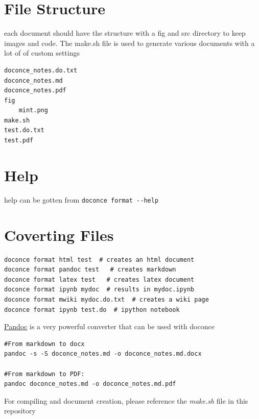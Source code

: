 \documentclass[%
twocolumn,
twoside,                 %
final,                   %
10pt]{article}
\begin{document}
\section{File Structure}
\label{sec:fil}

each document should have the structure with a fig and src directory to keep images and code. The make.sh file is used to generate various documents with a lot of of custom settings

\begin{verbatim}
doconce_notes.do.txt
doconce_notes.md
doconce_notes.pdf
fig
	mint.png
make.sh
test.do.txt
test.pdf
\end{verbatim}


\section{Help}

help can be gotten from \Verb!doconce format --help!

\section{Coverting Files}

\begin{verbatim}
doconce format html test  # creates an html document
doconce format pandoc test   # creates markdown
doconce format latex test   # creates latex document
doconce format ipynb mydoc  # results in mydoc.ipynb
doconce format mwiki mydoc.do.txt  # creates a wiki page
doconce format ipynb test.do  # ipython notebook
\end{verbatim}

\href{{http://pandoc.org/index.html}}{Pandoc} is a very powerful converter that can be used with doconce
\begin{verbatim}
#From markdown to docx
pandoc -s -S doconce_notes.md -o doconce_notes.md.docx

#From markdown to PDF:
pandoc doconce_notes.md -o doconce_notes.md.pdf
\end{verbatim}

For compiling and document creation, please reference the \emph{make.sh} file in this repository
\end{document}
